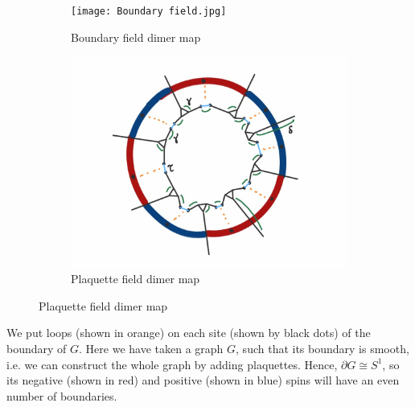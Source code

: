 \documentclass{article}
\begin{document}
	\begin{figure}[h]
		\centering
		\begin{subfigure}[b]{0.43\textwidth}
			\texttt{[image: Boundary field.jpg]}
			\caption{Boundary field dimer map}
			\label{fig:img1}
		\end{subfigure}
		\hfill
		\begin{subfigure}[b]{0.4\textwidth}
			\includegraphics[width=\textwidth]{Plaquette field.jpg}
			\caption{Plaquette field dimer map}
			\label{fig:img2}
		\end{subfigure}
	\end{figure}
	
	
	We put loops (shown in orange) on each site (shown by black dots) of the boundary of $G$. Here we have taken a graph $G$, such that its boundary is smooth, i.e. we can construct the whole graph by adding plaquettes. Hence, $\partial G \cong S^1$, so its negative (shown in red) and positive (shown in blue) spins will have an even number of boundaries. \\
	
\end{document}
